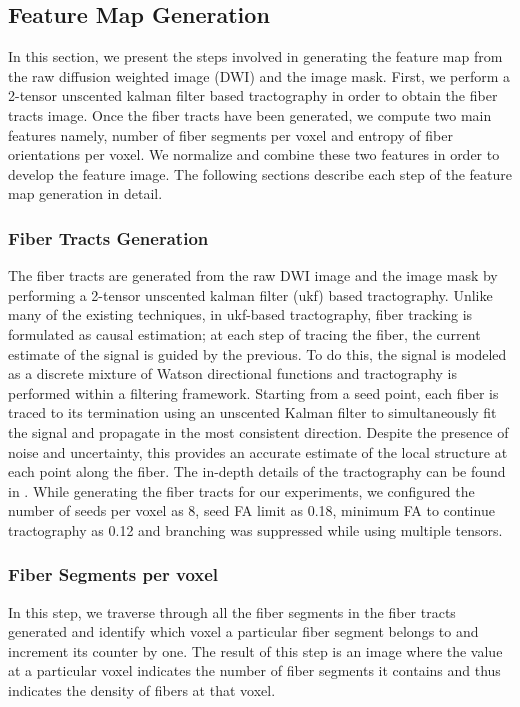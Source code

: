 \documentclass{llncs}
\begin{document}
%
\subsection{Feature Map Generation}
\label{subsec:FeatureMap}
%
In this section, we present the steps involved in generating the feature map from the raw diffusion weighted image (DWI) and the image mask. First, we perform a 2-tensor unscented kalman filter based tractography \cite{malc10} in order to obtain the fiber tracts image. Once the fiber tracts have been generated, we compute two main features namely, number of fiber segments per voxel and entropy of fiber orientations per voxel.  We normalize and combine these two features in order to develop the feature image. The following sections describe each step of the feature map generation in detail.

%
\subsubsection{Fiber Tracts Generation}
%
The fiber tracts are generated from the raw DWI image and the image mask by performing a 2-tensor unscented kalman filter (ukf) based tractography. Unlike many of the existing techniques, in ukf-based tractography, fiber tracking is formulated as causal estimation; at each step of tracing the fiber, the current estimate of the signal is guided by the previous. To do this, the signal is modeled as a discrete mixture of Watson directional functions and tractography is performed within a filtering framework. Starting from a seed point, each fiber is traced to its termination using an unscented Kalman filter to simultaneously fit the signal and propagate in the most consistent direction. Despite the presence of noise and uncertainty, this provides an accurate estimate of the local structure at each point along the fiber. The in-depth details of the tractography can be found in \cite{malc10}.  While generating the fiber tracts for our experiments, we configured the number of seeds per voxel as 8, seed FA limit as 0.18, minimum FA to continue tractography as 0.12 and branching was suppressed while using multiple tensors. 

%
\subsubsection{Fiber Segments per voxel}
%
In this step, we traverse through all the fiber segments in the fiber tracts generated and identify which voxel a particular fiber segment belongs to and increment its counter by one.  The result of this step is an image where the value at a particular voxel indicates the number of fiber segments it contains and thus indicates the density of fibers at that voxel.
\end{document}
